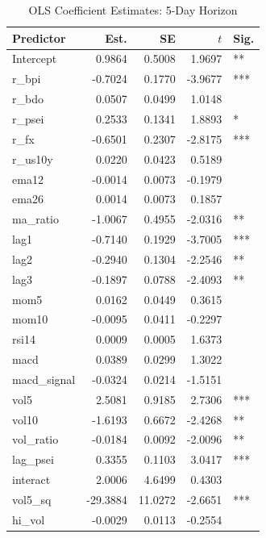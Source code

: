 \begin{table}
\centering
\caption{OLS Coefficient Estimates: 5-Day Horizon}
\label{tab:ols_coef_5d}
\footnotesize
\setlength{\tabcolsep}{6pt}
\begin{tabular*}{\linewidth}{@{\extracolsep{\fill}} l r r r l}
\toprule
Predictor & Est. & SE & $t$ & Sig. \\
\midrule
Intercept & 0.9864 & 0.5008 & 1.9697 & ** \\
r\_bpi & -0.7024 & 0.1770 & -3.9677 & *** \\
r\_bdo & 0.0507 & 0.0499 & 1.0148 &  \\
r\_psei & 0.2533 & 0.1341 & 1.8893 & * \\
r\_fx & -0.6501 & 0.2307 & -2.8175 & *** \\
r\_us10y & 0.0220 & 0.0423 & 0.5189 &  \\
ema12 & -0.0014 & 0.0073 & -0.1979 &  \\
ema26 & 0.0014 & 0.0073 & 0.1857 &  \\
ma\_ratio & -1.0067 & 0.4955 & -2.0316 & ** \\
lag1 & -0.7140 & 0.1929 & -3.7005 & *** \\
lag2 & -0.2940 & 0.1304 & -2.2546 & ** \\
lag3 & -0.1897 & 0.0788 & -2.4093 & ** \\
mom5 & 0.0162 & 0.0449 & 0.3615 &  \\
mom10 & -0.0095 & 0.0411 & -0.2297 &  \\
rsi14 & 0.0009 & 0.0005 & 1.6373 &  \\
macd & 0.0389 & 0.0299 & 1.3022 &  \\
macd\_signal & -0.0324 & 0.0214 & -1.5151 &  \\
vol5 & 2.5081 & 0.9185 & 2.7306 & *** \\
vol10 & -1.6193 & 0.6672 & -2.4268 & ** \\
vol\_ratio & -0.0184 & 0.0092 & -2.0096 & ** \\
lag\_psei & 0.3355 & 0.1103 & 3.0417 & *** \\
interact & 2.0006 & 4.6499 & 0.4303 &  \\
vol5\_sq & -29.3884 & 11.0272 & -2.6651 & *** \\
hi\_vol & -0.0029 & 0.0113 & -0.2554 &  \\
\bottomrule
\end{tabular*}
\\
\end{table}
